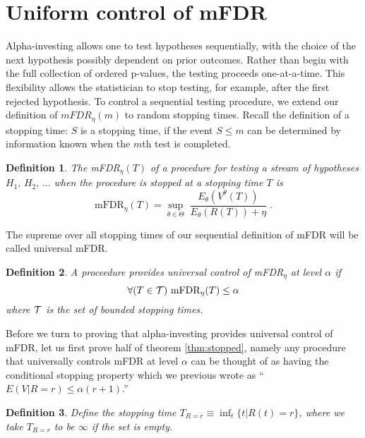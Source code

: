 \documentclass[12pt]{article}
\newtheorem{definition}{Definition}
\newcommand{\dpf}[1]{\noindent{\textcolor{blue}{\{{\bf dpf:} \em
#1\}}}}
\begin{document}
\section{Uniform control of mFDR}      \label{sec:sFDR}    %

Alpha-investing allows one to test hypotheses sequentially, with the choice of the next hypothesis possibly dependent on prior outcomes.  Rather than begin with the full collection of ordered p-values, the testing proceeds one-at-a-time.  This flexibility allows the statistician to stop testing, for example, after the first rejected hypothesis.  To control a sequential testing procedure, we extend our definition of $mFDR_\eta(m)$ to random stopping times.  Recall the definition of a stopping time: $S$ is a stopping  time, if the event $S \le m$ can be determined by information known when the $m$th test is completed.  

\begin{definition}
 The mFDR${}_{\eta}(T)$ of a procedure for testing a stream of hypotheses
 $H_1,\,H_2,\, \ldots$ when the procedure is stopped at a stopping
time $T$ is
\begin{displaymath}
  \mbox{mFDR}_\eta(T) 
   = \sup_{\theta \in \Theta} \; \frac{E_\theta (V^\theta(T))}{E_\theta(R(T) ) + \eta }\;.
\end{displaymath}
\end{definition}

The supreme over all stopping times of our sequential definition of
mFDR will be called universal mFDR.
\begin{definition}
 A proceedure provides universal control of mFDR$_\eta$ at level $\alpha$ if 
\begin{equation}
\forall(T \in {\cal T}) \,\,  \mbox{mFDR}_\eta(T) \le \alpha
\label{eq:def:sFDR}
\end{equation}
where ${\cal T}$ is the set of bounded stopping times.
\end{definition}

Before we turn to proving that alpha-investing provides universal
 control of mFDR, let us first prove half of theorem
 \ref{thm:stopped}, namely any procedure that universally controls mFDR at
 level $\alpha$ can be thought of as having the conditional stopping
 property which we previous wrote as ``$E(V|R=r) \le \alpha(r+1)$.''
\dpf{We no longer use above notation}
\begin{definition}
Define the stopping time $T_{R=r} \equiv \inf_{t}\{t|R(t) = r\}$, where
 we take $T_{R=r}$ to be $\infty$ if the set is empty.
\end{definition}
\end{document}
